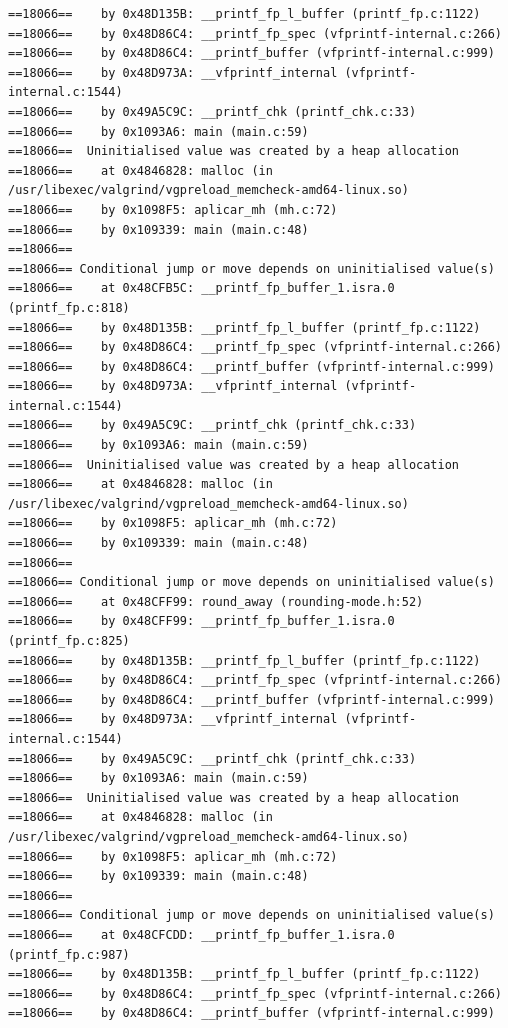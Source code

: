 \documentclass[12pt]{article}
\begin{document}
\begin{lstlisting}[style=EstiloValgrind]
==18066==    by 0x48D135B: __printf_fp_l_buffer (printf_fp.c:1122)
==18066==    by 0x48D86C4: __printf_fp_spec (vfprintf-internal.c:266)
==18066==    by 0x48D86C4: __printf_buffer (vfprintf-internal.c:999)
==18066==    by 0x48D973A: __vfprintf_internal (vfprintf-internal.c:1544)
==18066==    by 0x49A5C9C: __printf_chk (printf_chk.c:33)
==18066==    by 0x1093A6: main (main.c:59)
==18066==  Uninitialised value was created by a heap allocation
==18066==    at 0x4846828: malloc (in /usr/libexec/valgrind/vgpreload_memcheck-amd64-linux.so)
==18066==    by 0x1098F5: aplicar_mh (mh.c:72)
==18066==    by 0x109339: main (main.c:48)
==18066== 
==18066== Conditional jump or move depends on uninitialised value(s)
==18066==    at 0x48CFB5C: __printf_fp_buffer_1.isra.0 (printf_fp.c:818)
==18066==    by 0x48D135B: __printf_fp_l_buffer (printf_fp.c:1122)
==18066==    by 0x48D86C4: __printf_fp_spec (vfprintf-internal.c:266)
==18066==    by 0x48D86C4: __printf_buffer (vfprintf-internal.c:999)
==18066==    by 0x48D973A: __vfprintf_internal (vfprintf-internal.c:1544)
==18066==    by 0x49A5C9C: __printf_chk (printf_chk.c:33)
==18066==    by 0x1093A6: main (main.c:59)
==18066==  Uninitialised value was created by a heap allocation
==18066==    at 0x4846828: malloc (in /usr/libexec/valgrind/vgpreload_memcheck-amd64-linux.so)
==18066==    by 0x1098F5: aplicar_mh (mh.c:72)
==18066==    by 0x109339: main (main.c:48)
==18066== 
==18066== Conditional jump or move depends on uninitialised value(s)
==18066==    at 0x48CFF99: round_away (rounding-mode.h:52)
==18066==    by 0x48CFF99: __printf_fp_buffer_1.isra.0 (printf_fp.c:825)
==18066==    by 0x48D135B: __printf_fp_l_buffer (printf_fp.c:1122)
==18066==    by 0x48D86C4: __printf_fp_spec (vfprintf-internal.c:266)
==18066==    by 0x48D86C4: __printf_buffer (vfprintf-internal.c:999)
==18066==    by 0x48D973A: __vfprintf_internal (vfprintf-internal.c:1544)
==18066==    by 0x49A5C9C: __printf_chk (printf_chk.c:33)
==18066==    by 0x1093A6: main (main.c:59)
==18066==  Uninitialised value was created by a heap allocation
==18066==    at 0x4846828: malloc (in /usr/libexec/valgrind/vgpreload_memcheck-amd64-linux.so)
==18066==    by 0x1098F5: aplicar_mh (mh.c:72)
==18066==    by 0x109339: main (main.c:48)
==18066== 
==18066== Conditional jump or move depends on uninitialised value(s)
==18066==    at 0x48CFCDD: __printf_fp_buffer_1.isra.0 (printf_fp.c:987)
==18066==    by 0x48D135B: __printf_fp_l_buffer (printf_fp.c:1122)
==18066==    by 0x48D86C4: __printf_fp_spec (vfprintf-internal.c:266)
==18066==    by 0x48D86C4: __printf_buffer (vfprintf-internal.c:999)

\end{lstlisting}
\end{document}
